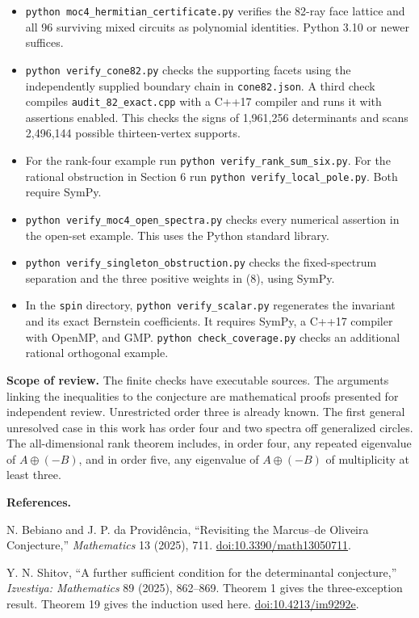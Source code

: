 \documentclass[11pt]{article}
\begin{document}
\begin{itemize}
\item \texttt{python moc4\_hermitian\_certificate.py} verifies the 82-ray face lattice and all 96 surviving mixed circuits as polynomial identities. Python 3.10 or newer suffices.
\item \texttt{python verify\_cone82.py} checks the supporting facets using the independently supplied boundary chain in \texttt{cone82.json}. A third check compiles \texttt{audit\_82\_exact.cpp} with a C++17 compiler and runs it with assertions enabled. This checks the signs of 1,961,256 determinants and scans 2,496,144 possible thirteen-vertex supports.
\item For the rank-four example run \texttt{python verify\_rank\_sum\_six.py}. For the rational obstruction in Section 6 run \texttt{python verify\_local\_pole.py}. Both require SymPy.
\item \texttt{python verify\_moc4\_open\_spectra.py} checks every numerical assertion in the open-set example. This uses the Python standard library.
\item \texttt{python verify\_singleton\_obstruction.py} checks the fixed-spectrum separation and the three positive weights in (8), using SymPy.
\item In the \texttt{spin} directory, \texttt{python verify\_scalar.py} regenerates the invariant and its exact Bernstein coefficients. It requires SymPy, a C++17 compiler with OpenMP, and GMP. \texttt{python check\_coverage.py} checks an additional rational orthogonal example.
\end{itemize}
\par\textbf{Scope of review.} The finite checks have executable sources. The arguments linking the inequalities to the conjecture are mathematical proofs presented for independent review. Unrestricted order three is already known. The first general unresolved case in this work has order four and two spectra off generalized circles. The all-dimensional rank theorem includes, in order four, any repeated eigenvalue of $A\oplus(-B)$, and in order five, any eigenvalue of $A\oplus(-B)$ of multiplicity at least three.
\par\textbf{References.}
\par [1] N. Bebiano and J. P. da Provid\^encia, ``Revisiting the Marcus--de Oliveira Conjecture,'' \emph{Mathematics} 13 (2025), 711. \href{https://doi.org/10.3390/math13050711}{doi:10.3390/math13050711}.
\par [2] Y. N. Shitov, ``A further sufficient condition for the determinantal conjecture,'' \emph{Izvestiya: Mathematics} 89 (2025), 862--869. Theorem 1 gives the three-exception result. Theorem 19 gives the induction used here. \href{https://doi.org/10.4213/im9292e}{doi:10.4213/im9292e}.
\end{document}
